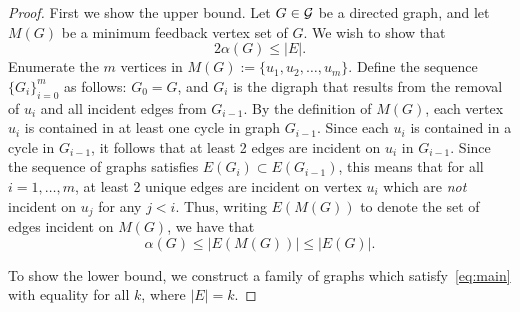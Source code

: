\documentclass[journal,12pt,onecolumn]{IEEETran}  %
\begin{document}
\begin{proof}
First we show the upper bound.
Let $G\in\mathcal{G}$ be a directed graph, and let $M(G)$ be a minimum feedback vertex set of $G$.
We wish to show that 
\begin{equation}
2\alpha(G)\leq |E|.
\end{equation}
Enumerate the $m$ vertices in $M(G):=\{u_1,u_2,\ldots,u_m\}$.
Define the sequence $\{G_i\}_{i=0}^m$ as follows: $G_0=G$, and $G_i$ is the digraph that results from the removal of $u_i$ and all incident edges from $G_{i-1}$.
By the definition of $M(G)$, each vertex $u_i$ is contained in at least one cycle in graph $G_{i-1}$.
Since each $u_i$ is contained in a cycle in $G_{i-1}$, it follows that at least 2 edges are incident on $u_i$ in $G_{i-1}$.
Since the sequence of graphs satisfies $E(G_{i})\subset E(G_{i-1})$, this means that for all $i=1,\ldots,m$, at least 2 unique edges are incident on vertex $u_i$ which are \emph{not} incident on $u_j$ for any $j<i$.
%
Thus, writing $E(M(G))$ to denote the set of edges incident on $M(G)$, we have that
\begin{equation}
\alpha(G)\leq|E(M(G))|\leq |E(G)|.
\end{equation}

To show the lower bound, we construct a family of graphs which satisfy~\eqref{eq:main} with equality for all $k$, where $|E|=k$.




\end{proof}









\end{document}
